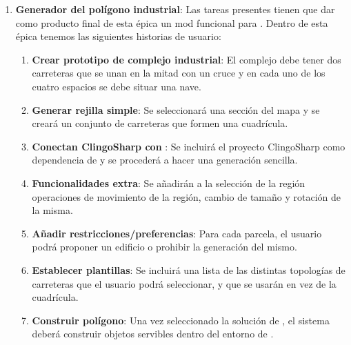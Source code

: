 \begin{enumerate}
	\item \textbf{Generador del polígono industrial}: Las tareas presentes tienen que dar como producto final de esta épica un mod funcional para \cities. Dentro de esta épica tenemos las siguientes historias de usuario:
	\begin{enumerate}[label={\arabic*.}]
		\item \textbf{Crear prototipo de complejo industrial}: El complejo debe tener dos carreteras que se unan en la mitad con un cruce y en cada uno de los cuatro espacios se debe situar una nave.
		\item \textbf{Generar rejilla simple}: Se seleccionará una sección del mapa y se creará un conjunto de carreteras que formen una cuadrícula.
		\item \textbf{Conectan ClingoSharp con \industrylp}: Se incluirá el proyecto ClingoSharp como dependencia de \industrylp y se procederá a hacer una generación sencilla.
		\item \textbf{Funcionalidades extra}: Se añadirán a la selección de la región operaciones de movimiento de la región, cambio de tamaño y rotación de la misma.
		\item \textbf{Añadir restricciones/preferencias}: Para cada parcela, el usuario podrá proponer un edificio o prohibir la generación del mismo.
		\item \textbf{Establecer plantillas}: Se incluirá una lista de las distintas topologías de carreteras que el usuario podrá seleccionar, y que se usarán en vez de la cuadrícula.
		\item \textbf{Construir polígono}: Una vez seleccionado la solución de \clingo, el sistema deberá construir objetos servibles dentro del entorno de \cities.
	\end{enumerate}


\end{enumerate}
